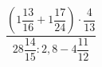\begin{ex}[type=calculate]
	\begin{condition}
		\( \dfrac{\left( 1\dfrac{13}{16}+1\dfrac{17}{24} \right)\cdot\dfrac{4}{13}}{28\dfrac{14}{15}:2,8-4\dfrac{11}{12}} \)
	\end{condition}
\end{ex}